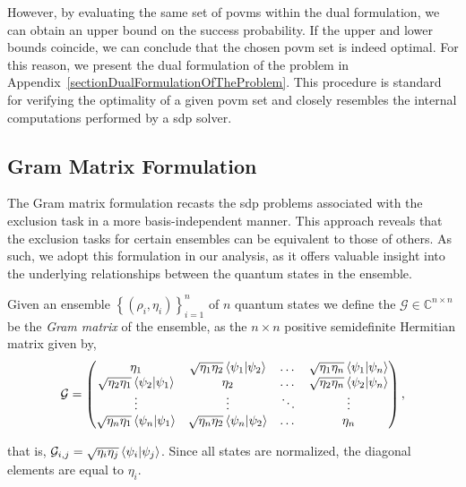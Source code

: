 \documentclass[12pt,letterpaper]{article}
\begin{document}
However, by evaluating the same set of \gls{povm}s within the dual formulation, we can obtain an upper bound on the success probability. If the upper and lower bounds coincide, we can conclude that the chosen \gls{povm} set is indeed optimal. For this reason, we present the dual formulation of the problem in Appendix~\ref{sectionDualFormulationOfTheProblem}. This procedure is standard for verifying the optimality of a given \gls{povm} set and closely resembles the internal computations performed by a \gls{sdp} solver.

\subsection{Gram Matrix Formulation}\label{sectionGramMatrixFormulation}
\hspace{20pt}The Gram matrix formulation recasts the \gls{sdp} problems associated with the exclusion task in a more basis-independent manner. This approach reveals that the exclusion tasks for certain ensembles can be equivalent to those of others. As such, we adopt this formulation in our analysis, as it offers valuable insight into the underlying relationships between the quantum states in the ensemble.

Given an ensemble $\left\{(\rho_i, \eta_i)\right\}_{i=1}^n$ of $n$ quantum states we define the $\mathcal{G} \in \mathbb{C}^{n \times n}$ be the \emph{Gram matrix} of the ensemble, as the $n \times n$ positive semidefinite Hermitian matrix given by,
\begin{equation*}
	\mathcal{G} =
	\begin{pmatrix}
		\eta_1 & \sqrt{\eta_1\eta_2}\braket{\psi_1|\psi_2} & \dots & \sqrt{\eta_1\eta_n}\braket{\psi_1|\psi_n} \\
		\sqrt{\eta_2\eta_1}\braket{\psi_2|\psi_1} & \eta_2 & \dots & \sqrt{\eta_2\eta_n}\braket{\psi_2|\psi_n} \\
		\vdots & \vdots & \ddots & \vdots \\
		\sqrt{\eta_n\eta_1}\braket{\psi_n|\psi_1} & \sqrt{\eta_n\eta_2}\braket{\psi_n|\psi_2} & \dots & \eta_n
	\end{pmatrix},
\end{equation*}

that is, $\mathcal{G}_{i,j} = \sqrt{\eta_i\eta_j}\braket{\psi_i|\psi_j}$. Since all states are normalized, the diagonal elements are equal to $\eta_i$.
\end{document}
